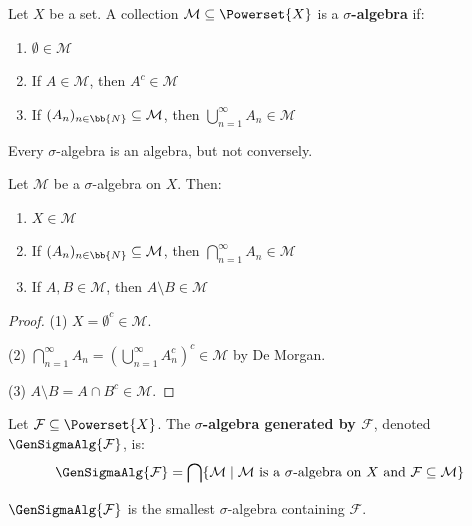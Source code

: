 \begin{definition}
Let $X$ be a set. A collection $\mathcal{M} \subseteq \Powerset{X}$ is a \textbf{$\sigma$-algebra} if:
\begin{enumerate}
    \item $\emptyset \in \mathcal{M}$
    \item If $A \in \mathcal{M}$, then $A^c \in \mathcal{M}$
    \item If $(A_n)_{n \in \bb{N}} \subseteq \mathcal{M}$, then $\bigcup_{n=1}^{\infty} A_n \in \mathcal{M}$
\end{enumerate}
\end{definition}

\begin{remark}
Every $\sigma$-algebra is an algebra, but not conversely.
\end{remark}

\begin{proposition}
Let $\mathcal{M}$ be a $\sigma$-algebra on $X$. Then:
\begin{enumerate}
    \item $X \in \mathcal{M}$
    \item If $(A_n)_{n \in \bb{N}} \subseteq \mathcal{M}$, then $\bigcap_{n=1}^{\infty} A_n \in \mathcal{M}$
    \item If $A, B \in \mathcal{M}$, then $A \setminus B \in \mathcal{M}$
\end{enumerate}
\end{proposition}

\begin{proof}
(1) $X = \emptyset^c \in \mathcal{M}$.

(2) $\bigcap_{n=1}^{\infty} A_n = \left(\bigcup_{n=1}^{\infty} A_n^c\right)^c \in \mathcal{M}$ by De Morgan.

(3) $A \setminus B = A \cap B^c \in \mathcal{M}$.
\end{proof}

\begin{definition}
Let $\mathcal{F} \subseteq \Powerset{X}$. The \textbf{$\sigma$-algebra generated by $\mathcal{F}$}, denoted $\GenSigmaAlg{\mathcal{F}}$, is:
\[ \GenSigmaAlg{\mathcal{F}} = \bigcap \{ \mathcal{M} \mid \mathcal{M} \text{ is a } \sigma\text{-algebra on } X \text{ and } \mathcal{F} \subseteq \mathcal{M} \} \]
\end{definition}

\begin{proposition}
$\GenSigmaAlg{\mathcal{F}}$ is the smallest $\sigma$-algebra containing $\mathcal{F}$.
\end{proposition}

